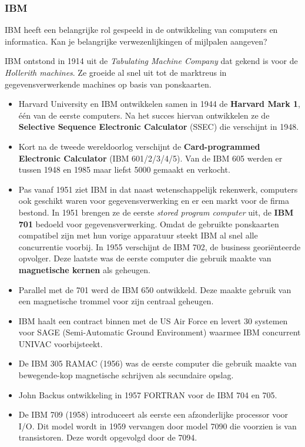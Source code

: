 \documentclass[../main.tex]{subfiles}
\begin{document}
\subsubsection{IBM}
\begin{question}
IBM heeft een belangrijke rol gespeeld in de ontwikkeling van computers en informatica. Kan je belangrijke verwezenlijkingen of mijlpalen aangeven?
\end{question}
\begin{solution}
IBM ontstond in 1914 uit de \emph{Tabulating Machine Company} dat gekend is voor de \emph{Hollerith machines}. Ze groeide al snel uit tot de marktreus in gegevensverwerkende machines op basis van ponskaarten.
\begin{itemize}
	\item Harvard University en IBM ontwikkelen samen in 1944 de \textbf{Harvard Mark 1}, \'e\'en van de eerste computers. Na het succes hiervan ontwikkelen ze de \textbf{Selective Sequence Electronic Calculator} (SSEC) die verschijnt in 1948.
	\item Kort na de tweede wereldoorlog verschijnt de \textbf{Card-programmed Electronic Calculator} (IBM 601/2/3/4/5). Van de IBM 605 werden er tussen 1948 en 1985 maar liefst 5000 gemaakt en verkocht.
	\item Pas vanaf 1951 ziet IBM in dat naast wetenschappelijk rekenwerk, computers ook geschikt waren voor gegevensverwerking en er een markt voor de firma bestond. In 1951 brengen ze de eerste \emph{stored program computer} uit, de \textbf{IBM 701} bedoeld voor gegevensverwerking. Omdat de gebruikte ponskaarten compatibel zijn met hun vorige apparatuur steekt IBM al snel alle concurrentie voorbij. In 1955 verschijnt de IBM 702, de business geori\"enteerde opvolger. Deze laatste was de eerste computer die gebruik maakte van \textbf{magnetische kernen} als geheugen.
	\item Parallel met de 701 werd de IBM 650 ontwikkeld. Deze maakte gebruik van een magnetische trommel voor zijn centraal geheugen.
	\item IBM haalt een contract binnen met de US Air Force en levert 30 systemen voor SAGE (Semi-Automatic Ground Environment) waarmee IBM concurrent UNIVAC voorbijsteekt.
	\item De IBM 305 RAMAC (1956) was de eerste computer die gebruik maakte van bewegende-kop magnetische schrijven als secundaire opslag.
	\item John Backus ontwikkeling in 1957 FORTRAN voor de IBM 704 en 705.
	\item De IBM 709 (1958) introduceert als eerste een afzonderlijke processor voor I/O. Dit model wordt in 1959 vervangen door model 7090 die voorzien is van transistoren. Deze wordt opgevolgd door de 7094.

\end{itemize}
\end{solution}
\end{document}
